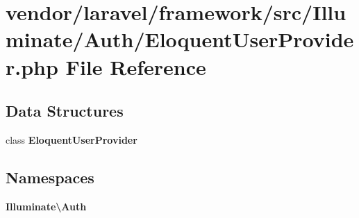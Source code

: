 \section{vendor/laravel/framework/src/\+Illuminate/\+Auth/\+Eloquent\+User\+Provider.php File Reference}
\label{_eloquent_user_provider_8php}
\subsection*{Data Structures}
\begin{DoxyCompactItemize}
\item 
class {\bf Eloquent\+User\+Provider}
\end{DoxyCompactItemize}
\subsection*{Namespaces}
\begin{DoxyCompactItemize}
\item 
 {\bf Illuminate\textbackslash{}\+Auth}
\end{DoxyCompactItemize}
